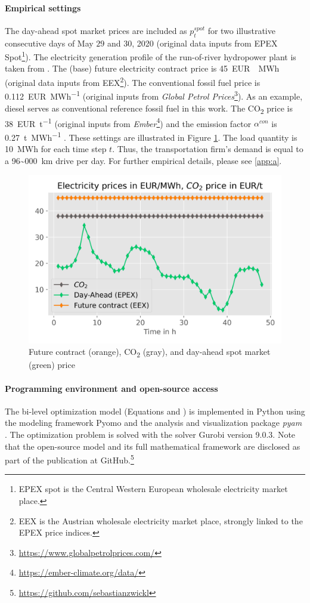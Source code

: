 \documentclass[review]{elsarticle}
\begin{document}
\paragraph{Empirical settings} The day-ahead spot market prices are included as $p_{t}^{spot}$ for two illustrative consecutive days of May $29$ and 30, 2020 \cite{EEG} (original data inputs from  EPEX Spot\footnote{EPEX spot is the Central Western European wholesale electricity market place.}). The electricity generation profile of the run-of-river hydropower plant is taken from \cite{EEG}. The (base) future electricity contract price is \SI{45}{EUR \per MWh} \cite{EEG} (original data inputs from EEX\footnote{EEX is the Austrian wholesale electricity market place, strongly linked to the EPEX price indices.}). The conventional fossil fuel price is \SI{0.112}{EUR\per MWh} \cite{EEG} (original inputs from \textit{Global Petrol Prices}\footnote{\url{https://www.globalpetrolprices.com/}}). As an example, diesel serves as conventional reference fossil fuel in this work. The CO\textsubscript{2} price is \SI{38}{EUR\per t} \cite{EEG} (original inputs from \textit{Ember}\footnote{\url{https://ember-climate.org/data/}}) and the emission factor $\alpha^{con}$ is \SI{0.27}{\tonne \per MWh} \cite{EEG}. These settings are illustrated in Figure \ref{fig:prices}. The load quantity is \SI{10}{MWh} for each time step $t$. Thus, the transportation firm's demand is equal to a \SI{96~000}{km} drive per day. For further empirical details, please see \ref{app:a}.

\begin{figure}[h]
	\centering
	\includegraphics[width=0.75\linewidth]{figures/numerical_example_prices.png}
	\caption{Future contract (orange), CO\textsubscript{2} (gray), and day-ahead spot market (green) price}
	\label{fig:prices}
\end{figure}

\paragraph{Programming environment and open-source access} The bi-level optimization model (Equations  and ) is implemented in Python using the modeling framework Pyomo \cite{hart2017optimization} and the analysis and visualization package \textit{pyam} \cite{huppmann2021pyam}. The optimization problem is solved with the solver Gurobi version 9.0.3. Note that the open-source model and its full mathematical framework are disclosed as part of the publication at GitHub.\footnote{\url{https://github.com/sebastianzwickl}} 
\newpage
\end{document}
